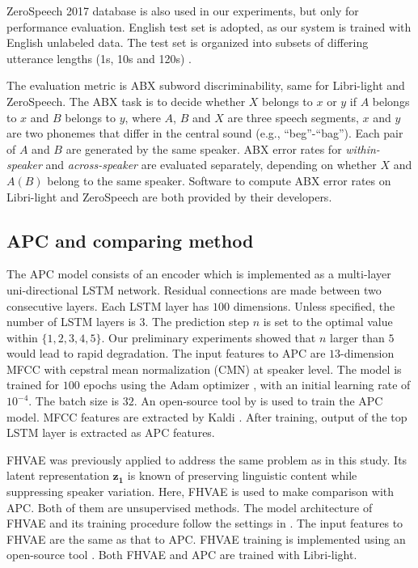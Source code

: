 \documentclass[a4paper]{article}
\newcommand{\quotes}[1]{``#1''}
\begin{document}
ZeroSpeech 2017 database is also used in our experiments, but only for performance evaluation.  English test set is adopted, as our system is trained with English unlabeled data. 
The test set is organized into subsets of differing utterance lengths (1s, 10s and 120s)  \cite{dunbar2017zero}.


The evaluation metric is  ABX subword discriminability, same for    Libri-light and ZeroSpeech.
The ABX task is to decide whether $X$ belongs to $x$ or $y$ if $A$ belongs to $x$ and $B$ belongs to $y$, where $A$, $B$ and $X$ are three speech segments, $x$ and $y$ are two phonemes that differ in the central sound (e.g., \quotes{beg}-\quotes{bag}). 
Each pair of $A$ and $B$ are generated by the same speaker. 
ABX error rates for \textit{within-speaker} and \textit{across-speaker} are evaluated separately, depending on whether $X$ and $A(B)$ belong to the same speaker. Software to compute ABX error rates on Libri-light and ZeroSpeech are both provided by their developers.
\subsection{APC and comparing method}
The APC model consists of an encoder which is implemented as a  multi-layer uni-directional LSTM network. Residual connections are made between two consecutive layers.  
Each LSTM layer has $100$ dimensions.
Unless specified, the number of LSTM layers is $3$.
The prediction step $n$ is set to  the optimal value within $\{1,2,3,4,5\}$. Our preliminary experiments showed that $n$ larger than $5$ would lead to rapid degradation. 
The input features to APC are $13$-dimension MFCC with cepstral mean normalization (CMN) at speaker level. 
The model is trained for $100$ epochs using the Adam optimizer \cite{kingma2014adam}, with an initial learning rate of $10^{-4}$. The batch size is  $32$. An open-source tool by \cite{Chung2019} is used to train the APC model. MFCC features are extracted by Kaldi \cite{povey2011kaldi}. After training, output of the top LSTM layer is extracted as APC features.

FHVAE was previously applied \cite{Feng2019improving} to address the same problem as in this study. Its latent representation $\bm{z_1}$ is known of preserving linguistic content while suppressing speaker variation. Here, FHVAE is used to make comparison with APC. Both of them are unsupervised methods. The model architecture of FHVAE and its training procedure follow the settings in \cite{Feng2019improving}.
The input features to FHVAE are  the same as  that to  APC. FHVAE training is implemented using an open-source tool \cite{hsu2017nips}. Both FHVAE and APC are trained with Libri-light. 
\end{document}
